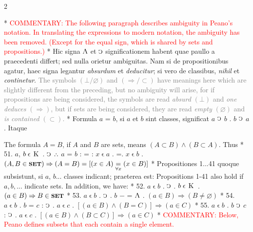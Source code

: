 \documentclass{book}
\newcommand{\C}{\mathop{\sbox0{$\displaystyle$$\reflectbox{C}$} %
\raisebox{-\height+\ht0-0.05cm}[\ht0][\dp0]{\scalebox{0.8}[0.8]{\copy0}}}\displaylimits} %
\newcommand{\pppNoSpace}{\leavevmode\lower0ex\hbox{.}\kern-0.1em\raise0.7ex\hbox{.}\kern-0.1em\lower0ex\hbox{.}} %
\newcommand{\abs}{\mathop{\rotatebox[origin=c]{180}{V}}}
\newcommand{\smallIn}{\ensuremath{\mathrel{\epsilon}}}
\newcommand{\K}{\mathop{\thinspace \text{K} \thinspace}}
\newcommand{\setOfSets}{\mathop{\text{{\footnotesize \textbf{SET}}}}}
\renewcommand{\rightarrow}{\Rightarrow}
\newcommand\irrelevant[1]{\textcolor{gray}{#1}}
\newcommand\commentary[1]{\textcolor{red}{COMMENTARY: #1}}
\newenvironment{translateTwoCol}
               { %
                 \columnratio{0.5, 0.5}
                 \begin{paracol}{2}
                 \newcommand{\LAT}{\switchcolumn[0]*}
                 \newcommand{\ENG}{\switchcolumn[1]}
               }
               { %
                 \let\ENG\undefined
                 \let\LAT\undefined
                 \end{paracol}
               }
\begin{document}
\begin{translateTwoCol}
\LAT
\ENG
\commentary{The following paragraph describes ambiguity in Peano's notation.  In translating the expressions to modern notation, the ambiguity has been removed.  (Except for the equal sign, which is shared by sets and propositions.) }
\LAT
Hic signa $\abs$ et $\C$ significationem habent quae paullo a praecedenti differt; sed nulla orietur ambiguitas. Nam si de propositionibus agatur, haec signa legantur \emph{absurdum} et \emph{deducitur}; si vero de classibus, \emph{nihil} et \emph{continetur}.
\ENG
\irrelevant{The symbols $(\bot / \varnothing)$ and $(\rightarrow / \subset)$ have meanings here which are slightly different from the preceding, but no ambiguity will arise, for if propositions are being considered, the symbols are read \emph{absurd} $(\bot)$ and \emph{one deduces} $(\rightarrow)$, but if sets are being considered, they are read \emph{empty} $(\varnothing)$ and \emph{is contained} $(\subset)$.}
\LAT
\quad Formula $a$ = $b$, si $a$ et $b$ sint classes, significat $a$ $\C$ $b$ . $b$ $\C$ $a$. Itaque
\ENG
\raggedright
\quad The formula $A = B$, if $A$ and $B$ are sets, means $(A \subset B) \wedge (B \subset A)$. Thus
\LAT
51. \hspace{0.67cm} $a$, $b \smallIn \K$ . $\C$ $\pppNoSpace$ $a$ = $b$ : = : $x \smallIn a$ . =\thinspace . $x \smallIn b$
\ENG
51. \hspace{0.67cm} $(A, B \in \setOfSets) \rightarrow (A = B) = [(x \in A) \underset{\forall x}=  (x \in B)]$
\LAT
Propositiones 1...41 quoque subsistunt, si $a$, $b$... classes indicant; praeterea est:
\ENG
Propositions 1-41 also hold if $a,b,...$ indicate sets. In addition, we have:
\LAT
52. \hspace{0.67cm} $a\smallIn b$ . $\C$ . $b \smallIn \K$
\ENG
52. \hspace{0.67cm} $(a \in B) \rightarrow B \in \setOfSets$
\LAT
53. \hspace{0.67cm} $a\smallIn b$ . $\C$ . $b$ $-$ = $\abs$
\ENG
53. \hspace{0.67cm} $(a \in B) \rightarrow (B \not= \varnothing)$
\LAT
54. \hspace{0.67cm} $a \smallIn b$ . $b$ = $c$ : $\C$ . $a \smallIn c$
\ENG
54. \hspace{0.67cm} $[(a \in B) \wedge (B = C)] \rightarrow (a \in C)$
\LAT
55. \hspace{0.67cm} $a \smallIn b$ . $b$ $\C$ $c$ : $\C$ . $a \smallIn c$
\ENG
55. \hspace{0.67cm} $[(a \in B) \wedge (B \subset C)] \rightarrow (a \in C)$
\LAT
\ENG
\commentary{Below, Peano defines subsets that each contain a single element.}

\end{translateTwoCol}
\end{document}
